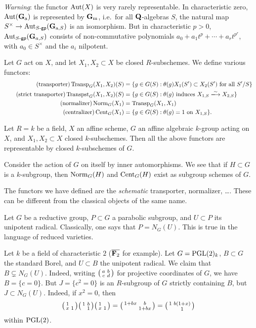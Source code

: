 \documentclass{article}
\begin{document}
\emph{Warning}: the functor $\operatorname{Aut}(X)$ is very rarely representable. 
In characteristic zero, $\operatorname{Aut}(\mathbf{G}_{\mathrm{a}})$ is represented by 
$\mathbf{G}_{\mathrm{m}}$, i.e.\ for all $\mathbf{Q}$-algebras $S$, the natural map 
$S^\times \to \operatorname{Aut}_{S\textnormal{-}\mathsf{gp}}(\mathbf{G}_{\mathrm{a},S})$ is 
an isomorphism. But in characteristic $p>0$, 
$\operatorname{Aut}_{S\textnormal{-}\mathsf{gp}}(\mathbf{G}_{a,S})$ consists of 
non-commutative polynomials $a_0+a_1 t^p + \cdots + a_r t^{p^r}$, with 
$a_0\in S^\times$ and the $a_i$ nilpotent. 

Let $G$ act on $X$, and let $X_1,X_2\subset X$ be closed $R$-subschemes. We 
define various functors: 
\begin{align*}\tag{transporter}
  \transporter_G(X_1,X_2)(S) &= \{g\in G(S):\theta(g)X_1(S')\subset X_2(S')\text{ for all }S'/S\} \\  \tag{strict transporter}
  \stricttransporter_G(X_1,X_2)(S) &= \{g\in G(S):\theta(g)\text{ induces }X_{1,S}\isomorphism X_{2,S}\} \\ \tag{normalizer}
  \normalizer_G(X_1) &= \transporter_G(X_1,X_1) \\ \tag{centralizer} 
  \centralizer_G(X_1) &= \{g\in G(S):\theta(g) = 1\text{ on }X_{1,S}\} .
\end{align*}

\begin{theorem}[Grothendieck]
Let $R=k$ be a field, $X$ an affine scheme, $G$ an affine algebraic $k$-group 
acting on $X$, and $X_1,X_2\subset X$ closed $k$-subschemes. Then all the above 
functors are representable by closed $k$-subschemes of $G$. 
\end{theorem}

\begin{example}
Consider the action of $G$ on itself by inner automorphisms. We see that if 
$H\subset G$ is a $k$-subgroup, then 
$\operatorname{Norm}_G(H)$ and $\operatorname{Cent}_G(H)$ exist as subgroup schemes of $G$. 
\end{example}

The functors we have defined are the \emph{schematic} transporter, normalizer, 
\ldots. These can be different from the classical objects of the same name. 

Let $G$ be a reductive group, $P\subset G$ a parabolic subgroup, and 
$U\subset P$ its unipotent radical. Classically, one says that 
$P=N_G(U)$. This is true in the language of reduced varieties. 

\begin{example}
Let $k$ be a field of characteristic $2$ ($\overline{\mathbf{F}_2}$ for example). 
Let $G=\operatorname{PGL}(2)_k$, $B\subset G$ the standard Borel, and 
$U\subset B$ the unipotent radical. We claim that 
$B\subsetneq N_G(U)$. Indeed, writing $\bigl(\begin{smallmatrix} a & b \\ c & d \end{smallmatrix} \bigr)$ for projective 
coordinates of $G$, we have $B=\{c=0\}$. But $J=\{c^2=0\}$ is an 
$R$-subgroup of $G$ strictly containing $B$, but $J\subset N_G(U)$. Indeed, 
if $x^2=0$, then 
\[
  \bigl(\begin{smallmatrix} 1 &  \\ x & 1 \end{smallmatrix} \bigr) \bigl(\begin{smallmatrix} 1 & b \\  & 1 \end{smallmatrix} \bigr) \bigl(\begin{smallmatrix} 1 &  \\ x & 1 \end{smallmatrix} \bigr) = \bigl(\begin{smallmatrix} 1+b x & b \\  & 1+b x \end{smallmatrix} \bigr) = \bigl(\begin{smallmatrix} 1 & b(1+x) \\  & 1 \end{smallmatrix} \bigr) 
\]
within $\operatorname{PGL}(2)$. 
\end{example}
\end{document}
